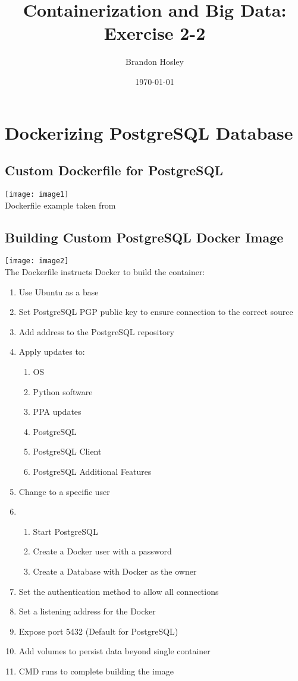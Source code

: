 \documentclass[]{article}
\title{Containerization and Big Data: Exercise 2-2}
\author{Brandon Hosley}
\date{\today}
\begin{document}
\maketitle

\setcounter{section}{1}
\section{Dockerizing PostgreSQL Database}
\setcounter{subsection}{4}

\subsection{Custom Dockerfile for PostgreSQL}
	\texttt{[image: image1]} \\
	Dockerfile example taken from
\subsection{Building Custom PostgreSQL Docker Image}
	\texttt{[image: image2]} \\
	The Dockerfile instructs Docker to build the container:
	\begin{enumerate}
		\item Use Ubuntu as a base
		\item Set PostgreSQL PGP public key to ensure connection to the correct source
		\item Add address to the PostgreSQL repository
		\item Apply updates to:
		\begin{enumerate}
			\item OS
			\item Python software
			\item PPA updates
			\item PostgreSQL 
			\item PostgreSQL Client
			\item PostgreSQL Additional Features
		\end{enumerate}
		\item Change to a specific user
		\item 
		\begin{enumerate}
			\item Start PostgreSQL
			\item Create a Docker user with a password
			\item Create a Database with Docker as the owner
		\end{enumerate}
		\item Set the authentication method to allow all connections
		\item Set a listening address for the Docker
		\item Expose port 5432 (Default for PostgreSQL)
		\item Add volumes to persist data beyond single container
		\item CMD runs to complete building the image
	\end{enumerate}
\end{document}
